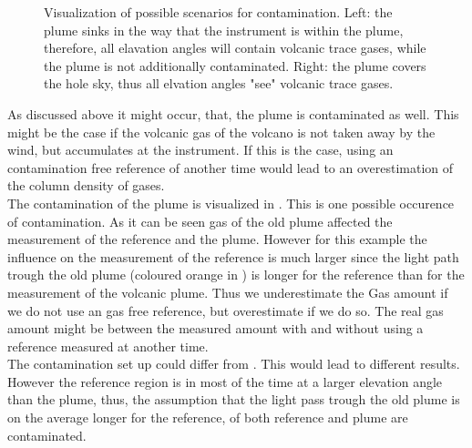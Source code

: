 \documentclass  [
  paper    = a4,
  BCOR     = 10mm,
  twoside,
  fontsize = 12pt,
  fleqn,
  toc      = bibnumbered,
  toc      = listofnumbered,
  numbers  = noendperiod,
  headings = normal,
  listof   = leveldown,
  version  = 3.03
]                                       {scrreprt}
\begin{document}
		\begin{figure}
			\centering
			\caption{Visualization of possible scenarios for contamination. Left: the plume sinks in the way that the instrument is within the plume, therefore, all elavation angles will contain volcanic trace gases, while the plume is not additionally contaminated. Right: the plume covers the hole sky, thus all elvation angles "see" volcanic trace gases. }
			\label{fig:contaminationplumewideplume}
		\end{figure}

	 As discussed above it might occur, that, the plume is contaminated as well. This might be the case if the volcanic gas of the volcano is not taken away by the wind, but accumulates at the instrument. If this is the case, using an contamination free reference of another time would lead to an overestimation of the column density of gases.\\
	 The contamination of the plume is visualized in . This is one possible occurence of contamination. As it can be seen gas of the old plume affected the measurement of the reference and the plume. However for this example the influence on the measurement of the reference is much larger since the light path trough the old plume (coloured orange in ) is longer for the reference than for the measurement of the volcanic plume. Thus we underestimate the Gas amount if we do not use an gas free reference, but overestimate if we do so.
	 The real gas amount might be between the measured amount with and without using a reference measured at another time.\\
	 The contamination set up could differ from . This would lead to different results. However the reference region is in most of the time at a larger elevation angle than the plume, thus, the assumption that the light pass trough the old plume is on the average longer for the reference, of both reference and plume are contaminated.
	 
\end{document}
